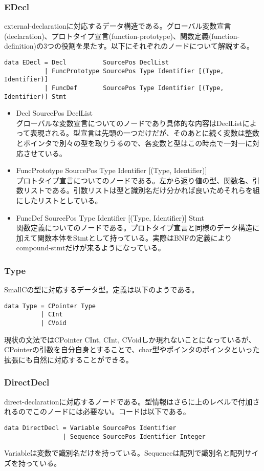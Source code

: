 \documentclass{jsarticle}
\begin{document}
\subsubsection{EDecl}
external-declarationに対応するデータ構造である。グローバル変数宣言(declaration)、プロトタイプ宣言(function-prototype)、関数定義(function-definition)の3つの役割を果たす。以下にそれぞれのノードについて解説する。
\begin{verbatim}
data EDecl = Decl          SourcePos DeclList
           | FuncPrototype SourcePos Type Identifier [(Type, Identifier)]
           | FuncDef       SourcePos Type Identifier [(Type, Identifier)] Stmt
\end{verbatim}
\begin{itemize}
\item Decl SourcePos DeclList \mbox{} \\
グローバルな変数宣言についてのノードであり具体的な内容はDeclListによって表現される。型宣言は先頭の一つだけだが、そのあとに続く変数は整数とポインタで別々の型を取りうるので、各変数と型はこの時点で一対一に対応させている。\\
\item FuncPrototype SourcePos Type Identifier [(Type, Identifier)] \mbox{} \\
プロトタイプ宣言についてのノードである。左から返り値の型、関数名、引数リストである。引数リストは型と識別名だけ分かれば良いためそれらを組にしたリストとしている。\\
\item FuncDef SourcePos Type Identifier [(Type, Identifier)] Stmt\mbox{} \\
関数定義についてのノードである。プロトタイプ宣言と同様のデータ構造に加えて関数本体をStmtとして持っている。実際はBNFの定義によりcompound-stmtだけが来るようになっている。\\
\end{itemize}

\subsubsection{Type}
SmallCの型に対応するデータ型。定義は以下のようである。
\begin{verbatim}
data Type = CPointer Type
          | CInt
          | CVoid
\end{verbatim}
現状の文法ではCPointer CInt, CInt, CVoidしか現れないことになっているが、CPointerの引数を自分自身とすることで、char型やポインタのポインタといった拡張にも自然に対応することができる。

\subsubsection{DirectDecl}
direct-declarationに対応するノードである。型情報はさらに上のレベルで付加されるのでこのノードには必要ない。コードは以下である。
\begin{verbatim}
data DirectDecl = Variable SourcePos Identifier
                | Sequence SourcePos Identifier Integer
\end{verbatim}
Variableは変数で識別名だけを持っている。Sequenceは配列で識別名と配列サイズを持っている。
\end{document}
